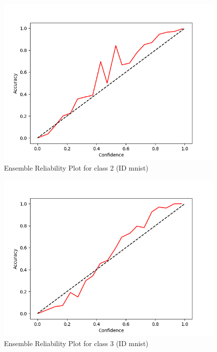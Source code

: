 \documentclass[11pt]{article}
\begin{document}
\begin{figure}[htbp]
\centering
\includegraphics[width=.9\linewidth]{./ens_mnist_rel_2.png}
\caption{\label{fig:orga775273}
Ensemble Reliability Plot for class 2 (ID mnist)}
\end{figure}

\begin{figure}[htbp]
\centering
\includegraphics[width=.9\linewidth]{./ens_mnist_rel_3.png}
\caption{\label{fig:org7248ef0}
Ensemble Reliability Plot for class 3 (ID mnist)}
\end{figure}
\end{document}
